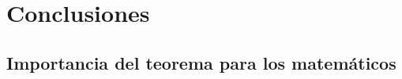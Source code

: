 \documentclass[spanish, utf8,handout]{beamer} %
\theoremstyle{definition}
\begin{document}
%	
%
%

\section{Conclusiones}

\subsection{Importancia del teorema para los matemáticos}
\end{document}
